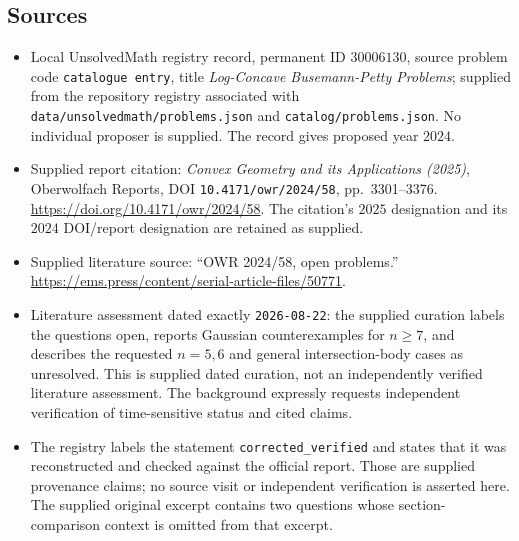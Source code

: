 \documentclass[11pt]{article}
\begin{document}
\subsection{Sources}
\begin{itemize}
\item Local UnsolvedMath registry record, permanent ID \(30006130\), source problem code \texttt{catalogue entry}, title \emph{Log-Concave Busemann-Petty Problems}; supplied from the repository registry associated with \texttt{data/unsolvedmath/problems.json} and \texttt{catalog/problems.json}. No individual proposer is supplied. The record gives proposed year \(2024\).
\item Supplied report citation: \emph{Convex Geometry and its Applications (2025)}, Oberwolfach Reports, DOI \texttt{10.4171/owr/2024/58}, pp.\ 3301--3376. \url{https://doi.org/10.4171/owr/2024/58}. The citation's \(2025\) designation and its \(2024\) DOI/report designation are retained as supplied.
\item Supplied literature source: ``OWR 2024/58, open problems.'' \url{https://ems.press/content/serial-article-files/50771}.
\item Literature assessment dated exactly \texttt{2026-08-22}: the supplied curation labels the questions open, reports Gaussian counterexamples for \(n\geq7\), and describes the requested \(n=5,6\) and general intersection-body cases as unresolved. This is supplied dated curation, not an independently verified literature assessment. The background expressly requests independent verification of time-sensitive status and cited claims.
\item The registry labels the statement \texttt{corrected\_verified} and states that it was reconstructed and checked against the official report. Those are supplied provenance claims; no source visit or independent verification is asserted here. The supplied original excerpt contains two questions whose section-comparison context is omitted from that excerpt.
\end{itemize}
\end{document}
